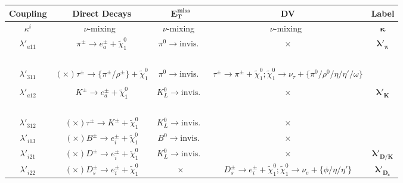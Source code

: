 \begin{table}[!ht]
\centering
\begin{adjustbox}{width=\columnwidth}
\begin{tabular}{|c|c|c|c|c|}
\hline
\bf{Coupling} & \bf{Direct Decays} & $\bm{E_T^\text{miss}}$ & \bf{DV} & \bf{Label}\\
\hline
$\kappa^i$ & $\nu$-mixing~\cite{Fernandez-Martinez:2023phj} & $\nu$-mixing~\cite{Fernandez-Martinez:2023phj} & $\nu$-mixing~\cite{Fernandez-Martinez:2023phj} & $\bm{\kappa}$\\
\hline
$\lambda'_{a11}$ & $\pi^\pm\to e^\pm_a + \tilde{\chi}^0_1$
& $\pi^0\to \text{invis.}$~\cite{NA62:2020pwi} & $\bm{\times}$ & \multirow{4}{*}{$\bm{\lambda'_{\pi}}$}\\[0.13 cm]
&~\cite{PiENu:2015seu, PIENU:2017wbj, PIENU:2019usb, PIONEER:2022alm} &&& \\[0.15 cm]
$\lambda'_{311}$ & $\left(\bm{\times}\right) \tau^\pm\to \{\pi^\pm/\rho^\pm\} + \tilde{\chi}^0_1$ & $\pi^0\to \text{invis.}$~\cite{NA62:2020pwi} & $\tau^\pm\to \pi^\pm + \tilde{\chi}^0_1; \tilde{\chi}^0_1 \to \nu_{\tau} + \{\pi^0/\rho^0/\eta/\eta'/\omega\}$
& \\[0.15 cm]
&&&\cite{Ballett:2019bgd, Kling:2018wct, DeVries:2020jbs, Beltran:2023nli}&\\
\hline
$\lambda'_{a12}$ & $K^\pm\to e^\pm_a + \tilde{\chi}^0_1$ & $K^0_L\to \text{invis.}$~\cite{ParticleDataGroup:2022pth} & $\bm{\times}$ & \multirow{4}{*}{$\bm{\lambda'_{K}}$}\\[0.15 cm]
&~\cite{Asano:1981he, Hayano:1982wu, NA62:2020mcv, NA62:2021bji} &&&\\[0.15 cm]
$\lambda'_{312}$ & $\left(\bm{\times}\right) \tau^\pm\to K^\pm + \tilde{\chi}^0_1$ & $K^0_L\to \text{invis.}$~\cite{ParticleDataGroup:2022pth} & $\bm{\times}$ & \\[0.15 cm]
\hline
$\lambda'_{i13}$ & $\left(\bm{\times}\right) B^\pm\to e^\pm_i + \tilde{\chi}^0_1$ & $B^0\to \text{invis.}$~\cite{BaBar:2012yut} & $\bm{\times}$ & $\bm{\lambda'_{B1}}$\\[0.15 cm]
\hline
$\lambda'_{i21}$ & $\left(\bm{\times}\right) D^\pm\to e^\pm_i + \tilde{\chi}^0_1$ & $K^0_L\to \text{invis.}$~\cite{ParticleDataGroup:2022pth} & $\bm{\times}$ & $\bm{\lambda'_{D/K}}$\\[0.15 cm]
\hline
$\lambda'_{i22}$ & $\left(\bm{\times}\right) D_s^\pm\to e^\pm_i + \tilde{\chi}^0_1$ & $\bm{\times}$ & $D_s^\pm\to e^\pm_i + \tilde{\chi}^0_1; \tilde{\chi}^0_1\to \nu_e + \{\phi/\eta/\eta'\}$ 
& $\bm{\lambda'_{D_s}}$\\[0.15 cm]

\end{tabular}
\end{adjustbox}
\end{table}
